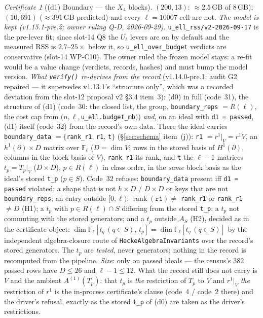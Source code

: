 \documentclass[11pt]{article}
\theoremstyle{remark}
\newtheorem{certificate}[theorem]{Certificate}
\newcommand{\F}{\mathbb{F}}
\newcommand{\Fl}{\F_\ell}
\DeclareMathOperator{\rank}{rank}
\begin{document}
\begin{certificate}[(d1) Boundary --- the $X_4$ blocks]
$(200,13)$: $\approx2.5$\,GB of $8$\,GB); $(10,691)$ ($\approx391$\,GB predicted) and every $\ell=10007$ cell are
not. \emph{The model is kept (v1.15.1-pre.2; owner ruling Q-D, 2026-09-29).} \texttt{u\_ell\_rss/v2-2026-09-17} is the pre-lever fit; since
slot-14 Q8 the $U_\ell$ levers are on by default and the measured RSS is $2.7$--$25\times$ below it, so \texttt{u\_ell\_over\_budget} verdicts are
conservative (slot-14 WP-C10). The owner ruled the frozen model stays: a re-fit would be a value change (verdicts, records, hashes) and must bump the model
version. \emph{What \texttt{verify()} re-derives from the record} (v1.14.0-pre.1; audit G2 repaired --- it
supersedes v1.13.1's ``structure only'', which was a recorded deviation from the slot-12 proposal v2 \S3.4
item~3): (d0) in full (code~31), the structure of (d1) (code~30: the closed list, the group,
\texttt{boundary\_reps} $=R(\ell)$, the cost cap from $(n,\ell,$\texttt{u\_ell.budget\_mb}$)$) \emph{and}, on an
ideal with \texttt{d1 = passed}, (d1) itself (code~32) from the record's own data. There the ideal carries
\texttt{boundary\_data} $=\{$\texttt{rank\_r1}, \texttt{r1}, \texttt{t}$\}$ (\S\ref{sec:schema} item~(j)):
\texttt{r1} $=r^1|_V=r^1V$, an $h^1(\partial)\times D$ matrix over $\Fl$ ($D=\dim V$; rows in the stored basis
of $H^1(\partial)$, columns in the block basis of $V$), \texttt{rank\_r1} its rank, and \texttt{t} the
$\ell-1$ matrices $t_p=T_p|_V$ ($D\times D$), $p\in R(\ell)$ in class order, in the \emph{same} block basis as
the ideal's stored \texttt{t\_p} ($p\in S$). Code~32 refuses: \texttt{boundary\_data} present iff
\texttt{d1 = passed} violated; a shape that is not $h\times D$ / $D\times D$ or keys that are not
\texttt{boundary\_reps}; an entry outside $[0,\ell)$; $\rank(\texttt{r1})\ne$ \texttt{rank\_r1} or
\texttt{rank\_r1} $\ne D$ (H1); a $t_p$ with $p\in R(\ell)\cap S$ differing from the stored \texttt{t\_p}; a
$t_p$ not commuting with the stored generators; and a $t_p$ outside $A_S$ (H2), decided as in the certificate
object: $\dim\Fl[t_q\,(q\in S),\,t_p]=\dim\Fl[t_q\,(q\in S)]$ by the independent algebra-closure route of
\texttt{HeckeAlgebraInvariants} over the record's stored generators. The $t_p$ are \emph{tested}, never
generators; nothing in the record is recomputed from the pipeline. \emph{Size}: only on passed ideals ---
the census's $382$ passed rows have $D\le26$ and $\ell-1\le12$. What the record still does not carry is
$V$ and the ambient $A^{(1)}(T_p)$: that $t_p$ is \emph{the} restriction of $T_p$ to $V$ and $r^1|_V$
\emph{the} restriction of $r^1$ is the in-process certificate's clause (code~4 / code~2 there) and the
driver's refusal, exactly as the stored \texttt{t\_p} of (d0) are taken as the driver's restrictions.
\end{certificate}
\end{document}
